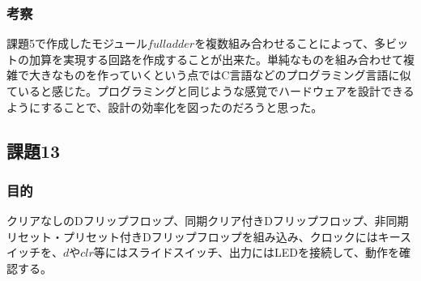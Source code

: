 \documentclass[a4paper]{jarticle}
\begin{document}
\subsubsection{考察}
課題5で作成したモジュール$fulladder$を複数組み合わせることによって、多ビットの加算を実現する回路を作成することが出来た。単純なものを組み合わせて複雑で大きなものを作っていくという点ではC言語などのプログラミング言語に似ていると感じた。プログラミングと同じような感覚でハードウェアを設計できるようにすることで、設計の効率化を図ったのだろうと思った。
\subsection{課題13}
\subsubsection{目的}
クリアなしのDフリップフロップ、同期クリア付きDフリップフロップ、非同期リセット・プリセット付きDフリップフロップを組み込み、クロックにはキースイッチを、$d$や$clr$等にはスライドスイッチ、出力にはLEDを接続して、動作を確認する。
\end{document}
